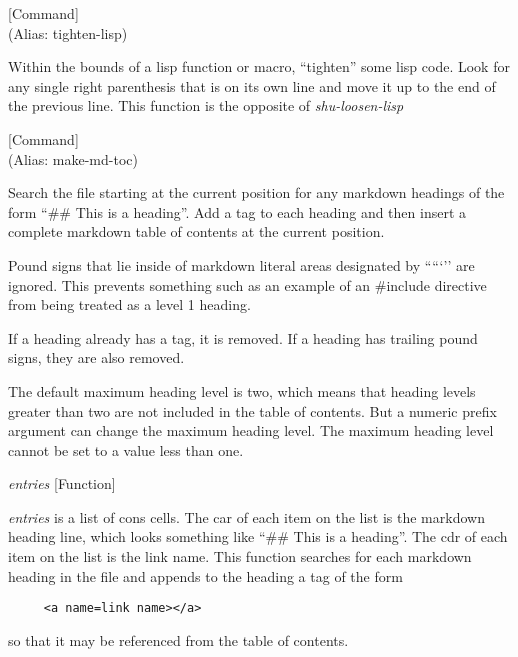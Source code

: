 \vspace{1em}
\noindent
{}
\usebox{\funcname}
 \hfill [Command]\\%
 (Alias: tighten-lisp)

\begin{doc-string}
Within the bounds of a lisp function or macro, ``tighten'' some lisp code.
Look for any single right parenthesis that is on its own line and move it up to
the end of the previous line.  This function is the opposite of \emph{shu-loosen-lisp}
\end{doc-string}

\vspace{1em}
\noindent
{}
\usebox{\funcname}
 \hfill [Command]\\%
 (Alias: make-md-toc)

\begin{doc-string}
Search the file starting at the current position for any markdown headings of
the form ``\#\# This is a heading''.  Add a tag to each heading and then insert a
complete markdown table of contents at the current position.

Pound signs that lie inside of markdown literal areas designated by `````'' are
ignored.  This prevents something such as an example of an \#include directive
from being treated as a level 1 heading.

If a heading already has a tag, it is removed.  If a heading has trailing pound
signs, they are also removed.

The default maximum heading level is two, which means that heading levels
greater than two are not included in the table of contents.  But a numeric
prefix argument can change the maximum heading level.  The maximum heading level
cannot be set to a value less than one.
\end{doc-string}

\vspace{1em}
\noindent
{}
\usebox{\funcname}\emph{entries}
 \hfill [Function]

\begin{doc-string}
\emph{entries} is a list of cons cells.  The car of each item on the list is the
markdown heading line, which looks something like ``\#\# This is a heading''.
The cdr of each item on the list is the link name.  This function searches for
each markdown heading in the file and appends to the heading a tag of the form

\small{\begin{verbatim}
     <a name=link name></a>
\end{verbatim}}

so that it may be referenced from the table of contents.
\end{doc-string}

